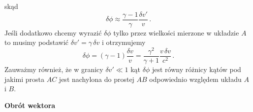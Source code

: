 \documentclass[../main.tex]{subfiles}
\begin{document}
skąd
\begin{equation*}
    \delta \phi\approx\frac{\gamma-1}{\gamma}\frac{\delta v'}{v}\,.
\end{equation*}
Jeśli dodatkowo chcemy wyrazić \(\delta\phi\) tylko przez wielkości mierzone w układzie \(A\) to
musimy podstawić \(\delta v'=\gamma\,\delta v\) i otrzymujemy
\begin{equation*}
    \delta\phi=(\gamma-1)\frac{\delta v}{v}=\frac{\gamma^2}{\gamma+1}\frac{v\,\delta v}{c^2}\,.
\end{equation*}
Zauważmy również, że w granicy \(\delta v'\ll 1\) kąt \(\delta \phi\) jest równy różnicy kątów pod
jakimi prosta \(AC\) jest nachylona do prostej \(AB\) odpowiednio względem układu \(A\) i \(B\).
\medskip

\noindent \textbf{Obrót wektora} 
\medskip
\end{document}
